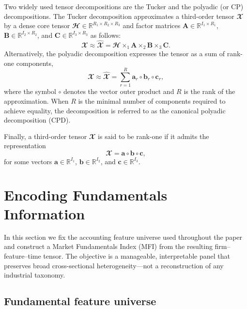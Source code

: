 \documentclass[pdflatex,sn-mathphys-num]{sn-jnl}%
\theoremstyle{thmstyleone}%
\theoremstyle{thmstyletwo}%
\theoremstyle{thmstylethree}%
\begin{document}
Two widely used tensor decompositions are the Tucker and the polyadic (or CP) decompositions. The Tucker decomposition approximates a third-order tensor $\mathbfcal{X}$ by a dense core tensor $\mathbfcal{H} \in \mathbb{R}^{R_1 \times R_2 \times R_3}$ and factor matrices $\mathbf{A} \in \mathbb{R}^{I_1 \times R_1}$, $\mathbf{B} \in \mathbb{R}^{I_2 \times R_2}$, and $\mathbf{C} \in \mathbb{R}^{I_3 \times R_3}$ as follows:
\begin{equation}
	\mathbfcal{X} \approx \widehat{\mathbfcal{X}} = \mathbfcal{H} \times_1 \mathbf{A} \times_2 \mathbf{B} \times_3 \mathbf{C}.
\end{equation}
Alternatively, the polyadic decomposition expresses the tensor as a sum of rank-one components,
\begin{equation}
	\label{Eq:CP}
	\mathbfcal{X} \approx \widehat{\mathbfcal{X}} = \sum_{r=1}^{R} \mathbf{a}_r \circ \mathbf{b}_r \circ \mathbf{c}_r,
\end{equation}
where the symbol $\circ$ denotes the vector outer product and $R$ is the rank of the approximation. When $R$ is the minimal number of components required to achieve equality, the decomposition is referred to as the canonical polyadic decomposition (CPD).

Finally, a third-order tensor $\mathbfcal{X}$ is said to be rank-one if it admits the representation
\begin{equation}
	\mathbfcal{X} = \mathbf{a} \circ \mathbf{b} \circ \mathbf{c},
\end{equation}
for some vectors $\mathbf{a} \in \mathbb{R}^{I_1}$, $\mathbf{b} \in \mathbb{R}^{I_2}$, and $\mathbf{c} \in \mathbb{R}^{I_3}$.



\section{Encoding Fundamentals Information}
\label{Section:Funadamentals}

In this section we fix the accounting feature universe used throughout the paper and construct a Market Fundamentals Index (MFI) from the resulting firm--feature--time tensor. The objective is a manageable, interpretable panel that preserves broad cross-sectional heterogeneity---not a reconstruction of any industrial taxonomy.

\subsection{Fundamental feature universe}
\label{Section:Feature_Selection}
\end{document}
